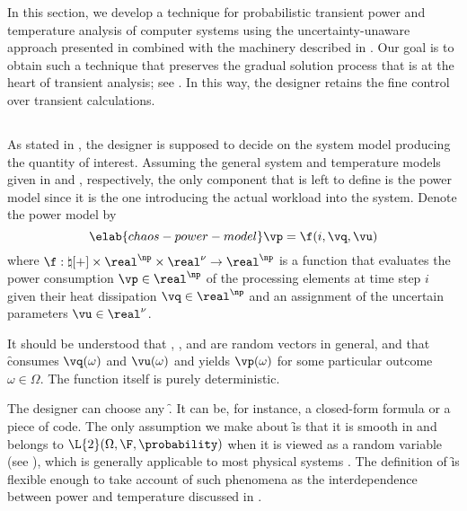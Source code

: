 In this section, we develop a technique for probabilistic transient power and
temperature analysis of computer systems using the uncertainty-unaware approach
presented in  combined with the machinery
described in . Our goal is to obtain such a
technique that preserves the gradual solution process that is at the heart of
transient analysis; see . In this way, the designer
retains the fine control over transient calculations.

\subsection{\problemtitle}

As stated in , the designer is supposed to
decide on the system model producing the quantity of interest. Assuming the
general system and temperature models given in  and
, respectively, the only component that is left to
define is the power model since it is the one introducing the actual workload
into the system. Denote the power model by
\begin{equation} \elab{chaos-power-model}
  \vp = \f(i, \vq, \vu)
\end{equation}
where $\f: \natural[+] \times \real^\np \times \real^\nu \to \real^\np$ is a
function that evaluates the power consumption $\vp \in \real^\np$ of the
processing elements at time step $i$ given their heat dissipation $\vq \in
\real^\np$ and an assignment of the uncertain parameters $\vu \in \real^\nu$.

\begin{remark}
It should be understood that \vp, \vq, and \vu are random vectors in general,
and that \f consumes $\vq(\omega)$ and $\vu(\omega)$ and yields $\vp(\omega)$
for some particular outcome $\omega \in \Omega$. The function itself is purely
deterministic.
\end{remark}

The designer can choose any \f. It can be, for instance, a closed-form formula
or a piece of code. The only assumption we make about \f is that it is smooth in
\vz and belongs to $\L{2}(\Omega, \F, \probability)$ when it is viewed as a
random variable (see ), which is generally applicable
to most physical systems \cite{xiu2010}. The definition of \f is flexible enough
to take account of such phenomena as the interdependence between power and
temperature discussed in .

